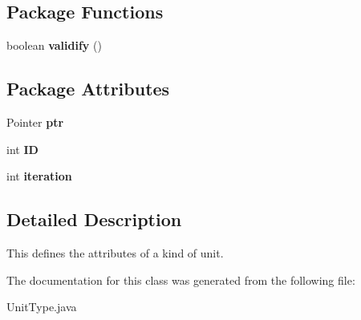 \subsection*{Package Functions}
\begin{CompactItemize}
\item 
\hypertarget{classUnitType_308c7365c7fbe5f2eb029ebebf4a9169}{
boolean \textbf{validify} ()}
\label{classUnitType_308c7365c7fbe5f2eb029ebebf4a9169}

\end{CompactItemize}
\subsection*{Package Attributes}
\begin{CompactItemize}
\item 
\hypertarget{classUnitType_317e5c230b561be0a2069e989e791dfb}{
Pointer \textbf{ptr}}
\label{classUnitType_317e5c230b561be0a2069e989e791dfb}

\item 
\hypertarget{classUnitType_fea395406713bc6b4dc1deebb6993347}{
int \textbf{ID}}
\label{classUnitType_fea395406713bc6b4dc1deebb6993347}

\item 
\hypertarget{classUnitType_b48689c2bbe776d8288fd2c1d61c0c1b}{
int \textbf{iteration}}
\label{classUnitType_b48689c2bbe776d8288fd2c1d61c0c1b}

\end{CompactItemize}


\subsection{Detailed Description}
This defines the attributes of a kind of unit. 

The documentation for this class was generated from the following file:\begin{CompactItemize}
\item 
UnitType.java\end{CompactItemize}
